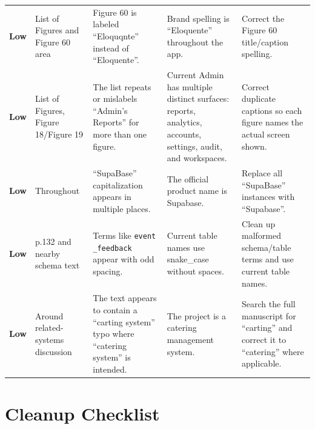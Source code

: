 \documentclass[11pt]{article}
\newcommand{\severitylow}{\textcolor{low}{\textbf{Low}}}
\begin{document}
\begin{landscape}
\begin{longtable}{L{0.72in} L{1.05in} L{2.05in} L{2.55in} L{2.55in}}
\severitylow & List of Figures and Figure 60 area & Figure 60 is labeled ``Eloquqnte'' instead of ``Eloquente''. & Brand spelling is ``Eloquente'' throughout the app. & Correct the Figure 60 title/caption spelling. \\

\severitylow & List of Figures, Figure 18/Figure 19 & The list repeats or mislabels ``Admin's Reports'' for more than one figure. & Current Admin has multiple distinct surfaces: reports, analytics, accounts, settings, audit, and workspaces. & Correct duplicate captions so each figure names the actual screen shown. \\

\severitylow & Throughout & ``SupaBase'' capitalization appears in multiple places. & The official product name is Supabase. & Replace all ``SupaBase'' instances with ``Supabase''. \\

\severitylow & p.132 and nearby schema text & Terms like \texttt{event \_feedback} appear with odd spacing. & Current table names use snake\_case without spaces. & Clean up malformed schema/table terms and use current table names. \\

\severitylow & Around related-systems discussion & The text appears to contain a ``carting system'' typo where ``catering system'' is intended. & The project is a catering management system. & Search the full manuscript for ``carting'' and correct it to ``catering'' where applicable. \\

\end{longtable}
\end{landscape}

\section*{Cleanup Checklist}
\end{document}
